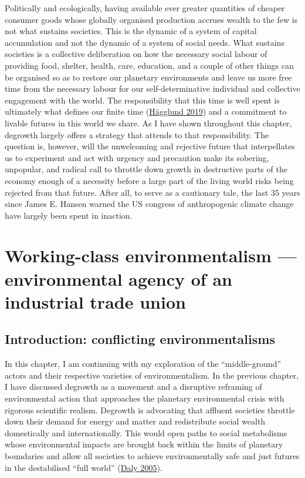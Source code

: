 \documentclass[a4paper, nobind]{templates/ociamthesis}
\begin{document}
Politically and ecologically, having available ever greater quantities of cheaper consumer goods whose globally organised production accrues wealth to the few is not what sustains societies. This is the dynamic of a system of capital accumulation and not the dynamic of a system of social needs. What sustains societies is a collective deliberation on how the necessary social labour of providing food, shelter, health, care, education, and a couple of other things can be organised so as to restore our planetary environments and leave us more free time from the necessary labour for our self-determinative individual and collective engagement with the world. The responsibility that this time is well spent is ultimately what defines our finite time (\protect\hyperlink{ref-hagglund_this_2019}{Hägglund 2019}) and a commitment to livable futures in this world we share. As I have shown throughout this chapter, degrowth largely offers a strategy that attends to that responsibility. The question is, however, will the unwelcoming and rejective future that interpellates us to experiment and act with urgency and precaution make its sobering, unpopular, and radical call to throttle down growth in destructive parts of the economy enough of a necessity before a large part of the living world risks being rejected from that future. After all, to serve as a cautionary tale, the last 35 years since James E. Hansen warned the US congress of anthropogenic climate change have largely been spent in inaction.

\hypertarget{working-class-environmentalism-environmental-agency-of-an-industrial-trade-union}{%
\chapter{Working-class environmentalism --- environmental agency of an industrial trade union}\label{working-class-environmentalism-environmental-agency-of-an-industrial-trade-union}}

\minitoc

\hypertarget{introduction-conflicting-environmentalisms}{%
\section{Introduction: conflicting environmentalisms}\label{introduction-conflicting-environmentalisms}}

In this chapter, I am continuing with my exploration of the ``middle-ground'' actors and their respective varieties of environmentalism. In the previous chapter, I have discussed degrowth as a movement and a disruptive reframing of environmental action that approaches the planetary environmental crisis with rigorous scientific realism. Degrowth is advocating that affluent societies throttle down their demand for energy and matter and redistribute social wealth domestically and internationally. This would open paths to social metabolisms whose environmental impacts are brought back within the limits of planetary boundaries and allow all societies to achieve environmentally safe and just futures in the destabilised ``full world'' (\protect\hyperlink{ref-daly_economics_2005}{Daly 2005}).
\end{document}
